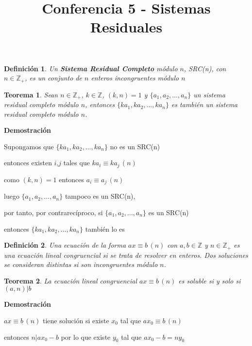\documentclass[a4paper,12pt]{report}
\title{Conferencia 5 - Sistemas Residuales}
\author{}
\newtheorem*{teo}{Teorema}
\newtheorem*{dfn}{Definición}
\begin{document}
\maketitle




\begin{dfn}
  Un \textbf{Sistema Residual Completo} módulo $n$, SRC(n), con $n\in\mathbb{Z}_+$, es un conjunto de $n$ enteros incongruentes módulo $n$
\end{dfn}



\begin{teo}
 Sean $n \in \mathbb{Z}_+$, $k\in\mathbb{Z}$, $(k,n)=1$ y $\{a_1,a_2,\dots,a_n\}$ un sistema residual completo módulo $n$, entonces $\{ka_1,ka_2,\dots,ka_n\}$ es también un sistema residual completo módulo $n$.
\end{teo}

\textbf{Demostración}

Supongamos que $\{ka_1,ka_2,\dots,ka_n\}$ no es un SRC(n)

entonces existen $i$,$j$ tales que $ka_i\equiv ka_j \, (n)$

como $(k,n)=1$ entonces $a_i\equiv a_j \, (n)$

luego $\{a_1,a_2,\dots,a_n\}$ tampoco es un SRC(n), 

por tanto, por contrarecíproco, si $\{a_1,a_2,\dots,a_n\}$ es un SRC(n) 

entonces $\{ka_1,ka_2,\dots,ka_n\}$ también lo es

\begin{dfn}
 Una ecuación de la forma $ax\equiv b \, (n)$ con $a,b\in\mathbb{Z}$ y $n\in\mathbb{Z}_+$ es una 
 ecuación lineal congruencial si se trata de resolver en enteros. Dos soluciones se consideran distintas si son incongruentes módulo $n$.
\end{dfn}

\begin{teo}
 La ecuación lineal congruencial $ax\equiv b \, (n)$ es soluble si y solo si $(a,n)|b$
\end{teo}

\textbf{Demostración}

$ax\equiv b \, (n)$ tiene solución si existe $x_0$ tal que $ax_0\equiv b \, (n)$

entonces $n|ax_0-b$ por lo que existe $y_0$ tal que $ax_0-b=ny_0$
\end{document}
